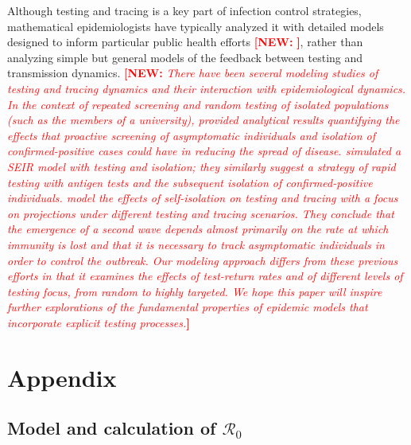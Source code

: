 \documentclass[12pt]{article}
\newcommand{\Rnum}{\ensuremath{\mathcal{R}_0}\xspace}
\DeclareRobustCommand\_{\ifmmode\expandafter\subtxt\else\textunderscore\fi}
\newcommand{\comment}{\showcomment}
\newcommand{\showcomment}[3]{\textcolor{#1}{\textbf{[#2: }\textsl{#3}\textbf{]}}}
\newcommand{\new}[1]{\comment{red}{NEW}{#1}}
\theoremstyle{definition} %
\begin{document}
Although testing and tracing is a key part of infection control strategies, mathematical epidemiologists have typically analyzed it with detailed models designed to inform particular public health efforts \new{\citep{endo2020implication,hellewell2020feasibility,jenness2020modeling}}, rather than analyzing simple but general models of the feedback between testing and transmission dynamics.
\new{There have been several modeling studies of testing and tracing dynamics and their interaction with epidemiological dynamics. In the context of repeated screening and random testing of isolated populations (such as the members of a university), \cite{bergstrom2020frequency} provided analytical results quantifying the effects that proactive screening of asymptomatic individuals and isolation of confirmed-positive cases could have in reducing the spread of disease. 
\cite{rogers2021high} simulated a SEIR model with testing and isolation; they similarly suggest a strategy of rapid testing with antigen tests and the subsequent isolation of confirmed-positive individuals.
\cite{friston2021testing} model the effects of self-isolation on testing and tracing with a focus on projections under different testing and tracing scenarios. They conclude that the emergence of a second wave depends almost primarily on the rate at which immunity is lost and that it is necessary to track asymptomatic individuals in order to control the outbreak. 
Our modeling approach differs from these previous efforts in that it examines the effects of test-return rates and of different levels of testing focus, from random to highly targeted. We hope this paper will inspire further explorations of the fundamental properties of epidemic models that incorporate explicit testing processes.}



\clearpage
\appendix
\section{Appendix}
\setcounter{equation}{0}
\setcounter{figure}{0}
\setcounter{table}{0}
\makeatletter
\renewcommand{\theequation}{A\arabic{equation}}
\renewcommand{\thefigure}{A\arabic{figure}}
\renewcommand{\bibnumfmt}[1]{[A#1]}
\renewcommand{\citenumfont}[1]{A#1}

\subsection{Model and calculation of $\Rnum$}\label{app:R0}
\end{document}
